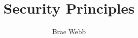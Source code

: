 \documentclass{csse4400}
\title{Security Principles}
\author{Brae Webb}
\date{\week{1}}
\begin{document}
\makecover





\end{document}
